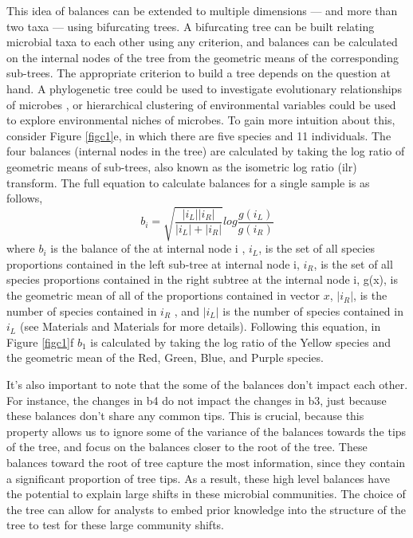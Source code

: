 This idea of balances can be extended to multiple dimensions — and more than two taxa — using bifurcating trees.  A bifurcating tree can be built relating microbial taxa to each other using any criterion, and balances can be calculated on the internal nodes of the tree from the geometric means of the corresponding sub-trees. The appropriate criterion to build a tree depends on the question at hand.  A phylogenetic tree could be used to investigate evolutionary relationships of microbes \cite{Silverman2018-ql} \cite{Washburne2017-up}, or hierarchical clustering of environmental variables could be used to explore environmental niches of microbes.  To gain more intuition about this, consider Figure \ref{figc1}e, in which there are five species and 11 individuals. The four balances (internal nodes in the tree) are calculated by taking the log ratio of geometric means of sub-trees, also known as the isometric log ratio (\gls{ilr}) transform.  The full equation to calculate balances for a single sample is as follows,
\begin{equation}
b_{i}=\sqrt{\frac{\left| i_{L}\right| \left| i_{R}\right|}{\left| i_{L}\right|+ \left| i_{R}\right|}}log \frac{g(i_{L})}{g(i_{R})}
\end{equation}
where $b_{i}$ is the balance of the at internal node i ,  $i_{L}$, is the set of all species proportions contained in the left sub-tree at internal node i, $i_{R}$,  is the set of all species proportions contained in the right subtree at the internal node  i, g(x),  is the geometric mean of all of the proportions contained in vector $x$, $ \left| i_{R}\right|$,  is the number of species contained in  $i_{R}$ , and  $ \left| i_{L}\right|$ is the number of species contained in $ i_{L}$ (see Materials and Materials for more details). Following this equation, in Figure \ref{figc1}f  $b_{1}$ is calculated by taking the log ratio of the Yellow species and the geometric mean of the Red, Green, Blue, and Purple species.  \par
 It's also important to note that the some of the balances don't impact each other.  For instance, the changes in b4 do not impact the changes in b3, just because these balances don't share any common tips.  This is crucial, because this property allows us to ignore some of the variance of the balances towards the tips of the tree, and focus on the balances closer to the root of the tree.  These balances toward the root of tree capture the most information, since they contain a significant proportion of tree tips.  As a result, these high level balances have the potential to explain large shifts in these microbial communities.  The choice of the tree can allow for analysts to embed prior knowledge into the structure of the tree to test for these large community shifts.\par
